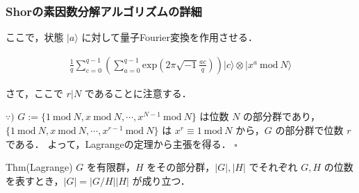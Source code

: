 \documentclass[dvipdfmx,12pt]{beamer}
\begin{document}
\begin{frame}

\frametitle{Shorの素因数分解アルゴリズムの詳細}

ここで，状態 $ | a \rangle $ に対して量子Fourier変換を作用させる． \vspace{-25pt}

\begin{align*}
    \displaystyle \frac{1}{q} \sum_{c = 0}^{q - 1} \left( \sum_{a = 0}^{q - 1} \mathrm{exp} \left( 2 \pi \sqrt{-1} \frac{ac}{q} \right) \right) | c \rangle \otimes |x^a \ \mathrm{mod} \ N \rangle
\end{align*}

さて，ここで $ r | N $ であることに注意する． \\

\vspace{10pt}

$ \because ) $ $ G := \{ 1 \ \mathrm{mod} \ N, x \ \mathrm{mod} \ N, \cdots, x^{N - 1} \ \mathrm{mod} \ N  \} $ は位数 $N$ の部分群であり，
$ \{ 1 \ \mathrm{mod} \ N, x \ \mathrm{mod} \ N, \cdots, x^{r - 1} \ \mathrm{mod} \ N  \} $ は $ x^r \equiv 1 \ \mathrm{mod} \ N $ から，$G$ の部分群で位数 $ r $ である．
よって，Lagrangeの定理から主張を得る． \hspace{\fill} $ \square $

\vspace{10pt}

\begin{itembox}[l]{Thm(Lagrange)}
    $G$ を有限群，$H$ をその部分群，$|G|, |H|$ でそれぞれ $ G, H $ の位数を表すとき，$ |G| = |G/H| |H| $ が成り立つ．
\end{itembox} 

\end{frame}
\end{document}
